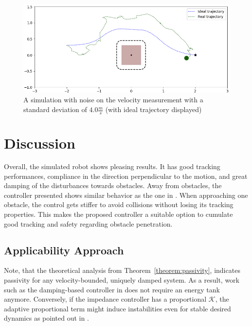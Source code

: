 \documentclass[conference]{IEEEtran}
\begin{document}
\begin{figure}
\centerline{\includegraphics[width=\columnwidth]{figures/vel_noise_4.0.png}}
\caption{A simulation with noise on the velocity measurement with a standard deviation of $4.0 \frac{m}{s}$  (with ideal trajectory displayed)}
\label{fig_2_vel_noise}
\end{figure}
 
\section{Discussion}
Overall, the simulated robot shows pleasing results. It has good tracking performances, compliance in the direction perpendicular to the motion, and great damping of the disturbances towards obstacles.
Away from obstacles, the controller presented shows similar behavior as the one in \cite{kronander2015passive}. When approaching one obstacle, the control gets stiffer to avoid collisions without losing its tracking properties. This makes the proposed controller a suitable option to cumulate good tracking and safety regarding obstacle penetration.

\subsection{Applicability Approach}
Note, that the theoretical analysis from Theorem~\ref{theorem:passivity}, indicates passivity for any velocity-bounded, uniquely damped system. As a result, work such as the damping-based controller in  \cite{kronander2015passive} does not require an energy tank anymore.
Conversely, if the impedance controller has a proportional $\mathcal{K}$, the adaptive proportional term might induce instabilities even for stable desired dynamics as pointed out in \cite{ferraguti2013tank, kronander2016stability}.
\end{document}
